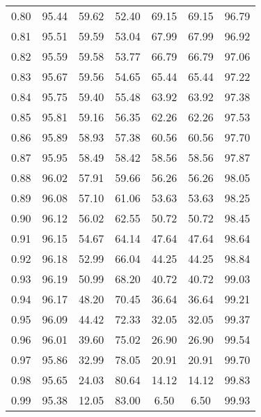 \begin{tabular}{|c|c|c|c|c|c|c|}
      0.80 &     95.44 &     59.62 &      52.40 &   69.15 &      69.15 &         96.79 \\
      0.81 &     95.51 &     59.59 &      53.04 &   67.99 &      67.99 &         96.92 \\
      0.82 &     95.59 &     59.58 &      53.77 &   66.79 &      66.79 &         97.06 \\
      0.83 &     95.67 &     59.56 &      54.65 &   65.44 &      65.44 &         97.22 \\
      0.84 &     95.75 &     59.40 &      55.48 &   63.92 &      63.92 &         97.38 \\
      0.85 &     95.81 &     59.16 &      56.35 &   62.26 &      62.26 &         97.53 \\
      0.86 &     95.89 &     58.93 &      57.38 &   60.56 &      60.56 &         97.70 \\
      0.87 &     95.95 &     58.49 &      58.42 &   58.56 &      58.56 &         97.87 \\
      0.88 &     96.02 &     57.91 &      59.66 &   56.26 &      56.26 &         98.05 \\
      0.89 &     96.08 &     57.10 &      61.06 &   53.63 &      53.63 &         98.25 \\
      0.90 &     96.12 &     56.02 &      62.55 &   50.72 &      50.72 &         98.45 \\
      0.91 &     96.15 &     54.67 &      64.14 &   47.64 &      47.64 &         98.64 \\
      0.92 &     96.18 &     52.99 &      66.04 &   44.25 &      44.25 &         98.84 \\
      0.93 &     96.19 &     50.99 &      68.20 &   40.72 &      40.72 &         99.03 \\
      0.94 &     96.17 &     48.20 &      70.45 &   36.64 &      36.64 &         99.21 \\
      0.95 &     96.09 &     44.42 &      72.33 &   32.05 &      32.05 &         99.37 \\
      0.96 &     96.01 &     39.60 &      75.02 &   26.90 &      26.90 &         99.54 \\
      0.97 &     95.86 &     32.99 &      78.05 &   20.91 &      20.91 &         99.70 \\
      0.98 &     95.65 &     24.03 &      80.64 &   14.12 &      14.12 &         99.83 \\
      0.99 &     95.38 &     12.05 &      83.00 &    6.50 &       6.50 &         99.93 \\
\bottomrule
\end{tabular}
